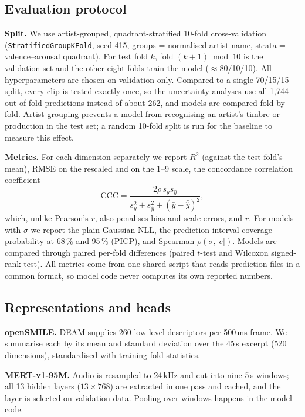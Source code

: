 \documentclass[conference]{IEEEtran}
\newcommand{\R}{R^2}
\begin{document}
\subsection{Evaluation protocol}
\textbf{Split.} We use artist-grouped, quadrant-stratified 10-fold
cross-validation (\texttt{StratifiedGroupKFold}, seed 415, groups = normalised
artist name, strata = valence--arousal quadrant). For test fold $k$, fold
$(k{+}1)\bmod 10$ is the validation set and the other eight folds train the
model ($\approx$80/10/10). All hyperparameters are chosen on validation only.
Compared to a single 70/15/15 split, every clip is tested exactly once, so the
uncertainty analyses use all 1{,}744 out-of-fold predictions instead of about
262, and models are compared fold by fold. Artist grouping prevents a model
from recognising an artist's timbre or production in the test set; a random
10-fold split is run for the baseline to measure this effect.

\textbf{Metrics.} For each dimension separately we report $\R$ (against the
test fold's mean), RMSE on the rescaled and on the 1--9 scale, the concordance
correlation coefficient
\begin{equation}
\mathrm{CCC} = \frac{2\rho\, s_y s_{\hat y}}{s_y^2 + s_{\hat y}^2 + (\bar y - \bar{\hat y})^2},
\end{equation}
which, unlike Pearson's $r$, also penalises bias and scale errors, and $r$.
For models with $\sigma$ we report the plain Gaussian NLL, the prediction
interval coverage probability at 68\,\% and 95\,\% (PICP), and Spearman
$\rho(\sigma, |e|)$. Models are compared through paired per-fold differences
(paired $t$-test and Wilcoxon signed-rank test). All metrics come from one
shared script that reads prediction files in a common format, so model code
never computes its own reported numbers.

\subsection{Representations and heads}
\textbf{openSMILE.} DEAM supplies 260 low-level descriptors per 500\,ms frame.
We summarise each by its mean and standard deviation over the 45\,s excerpt
(520 dimensions), standardised with training-fold statistics.

\textbf{MERT-v1-95M.} Audio is resampled to 24\,kHz and cut into nine 5\,s
windows; all 13 hidden layers ($13\times768$) are extracted in one pass and
cached, and the layer is selected on validation data. Pooling over windows
happens in the model code.
\end{document}
